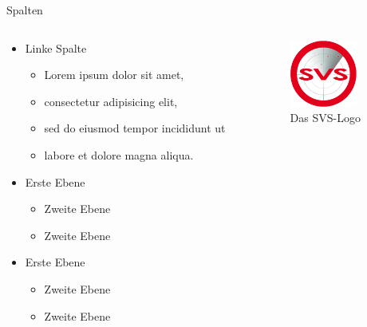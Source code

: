 \documentclass[t]{beamer}
\begin{document}
\begin{frame}{Spalten}
	\begin{columns}[T]
		\begin{column}{.6\textwidth}
			\begin{itemize}
				\item Linke Spalte
				\begin{itemize}
					\item Lorem ipsum dolor sit amet, 
					\item consectetur adipisicing elit, 
					\item sed do eiusmod tempor incididunt ut 
					\item labore et dolore magna aliqua. 
				\end{itemize}
				\item Erste Ebene
				\begin{itemize}
					\item Zweite Ebene
					\item Zweite Ebene
				\end{itemize}
				\item Erste Ebene
				\begin{itemize}
					\item Zweite Ebene
					\item Zweite Ebene
				\end{itemize}
			\end{itemize}
		\end{column}		
		\begin{column}{.4\textwidth}
			\begin{center}
				\vspace{1cm}
				\includegraphics[width=2.2cm]{../pic/svs_logo_uhhred.png} \\
				Das SVS-Logo				
			\end{center}
		\end{column}
	\end{columns}	
\end{frame}
\end{document}
